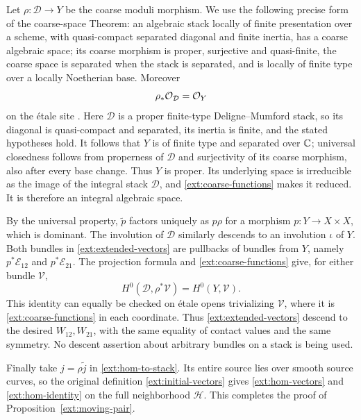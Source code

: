 Let $\rho:\mathcal D\to Y$ be the coarse moduli morphism. We use
the following precise form of the coarse-space Theorem: an
algebraic stack locally of finite presentation over a scheme,
with quasi-compact separated diagonal and finite inertia, has a coarse
algebraic space; its coarse
morphism is proper, surjective and quasi-finite, the coarse space
is separated when the stack is separated, and is locally of finite
type over a locally Noetherian base. Moreover
\begin{equation}\label{ext:coarse-functions}
\rho_*\mathcal O_{\mathcal D}=\mathcal O_Y
\end{equation}
on the \'etale site
\cite[Theorem~1.1 and the following note]{ConradKM}.
Here $\mathcal D$ is a proper finite-type Deligne--Mumford stack,
so its diagonal is quasi-compact and separated, its inertia is finite,
and the stated hypotheses hold. It follows
that $Y$ is of finite type and separated over $\mathbb C$; universal
closedness follows from properness of $\mathcal D$ and surjectivity
of its coarse morphism, also after every base change. Thus $Y$ is
proper. Its underlying space is irreducible as the image of the
integral stack $\mathcal D$, and \eqref{ext:coarse-functions} makes
it reduced. It is therefore an integral algebraic space.

By the universal property, $\widetilde p$ factors uniquely as
$p\rho$ for a morphism $p:Y\to X\times X$, which is dominant.
The involution of $\mathcal D$ similarly descends to an involution
$\iota$ of $Y$. Both bundles in \eqref{ext:extended-vectors} are
pullbacks of bundles from $Y$, namely $p^*\mathcal E_{12}$ and
$p^*\mathcal E_{21}$. The projection formula and
\eqref{ext:coarse-functions} give, for either bundle $\mathcal V$,
\[
H^0(\mathcal D,\rho^*\mathcal V)=H^0(Y,\mathcal V).
\]
This identity can equally be checked on \'etale opens trivializing
$\mathcal V$, where it is \eqref{ext:coarse-functions} in each
coordinate. Thus \eqref{ext:extended-vectors} descend to the desired
$W_{12},W_{21}$, with the same equality of contact values and the
same symmetry. No descent assertion about arbitrary bundles on a
stack is being used.

Finally take $j=\rho\widetilde j$ in
\eqref{ext:hom-to-stack}. Its entire source lies over smooth source
curves, so the original definition \eqref{ext:initial-vectors}
gives \eqref{ext:hom-vectors} and \eqref{ext:hom-identity} on the
full neighborhood $\mathcal H$. This completes the proof of
Proposition~\ref{ext:moving-pair}.

